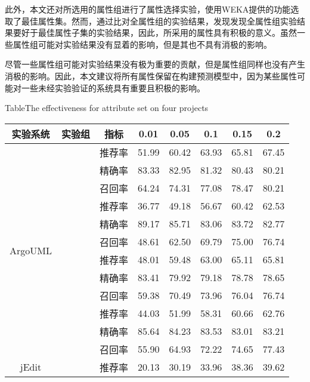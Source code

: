 此外，本文还对所选用的属性组进行了属性选择实验，使用WEKA提供的功能选取了最佳属性集。然而，通过比对全属性组的实验结果，发现发现全属性组实验结果要好于最佳属性子集的实验结果，因此，所采用的属性具有积极的意义。虽然一些属性组可能对实验结果没有显着的影响，但是其也不具有消极的影响。

尽管一些属性组可能对实验结果没有极为重要的贡献，但是属性组同样也没有产生消极的影响。因此，本文建议将所有属性保留在构建预测模型中，因为某些属性可能对一些未经实验验证的系统具有重要且积极的影响。

\begin{table} 
\renewcommand\arraystretch{0.65} 
{Table$\!$}{The effectiveness for attribute set on four projects}
\vspace{0.5em}
\centering
\wuhao
\begin{tabular}{cccccccc}
\toprule[1.5pt]
{实验系统}&{实验组}&{指标}&{0.01}&{0.05}&{0.1}&{0.15}&{0.2}\\
\midrule[1pt]
\multirow{12}{*}{ArgoUML}
&~\multirow{3}{*}{全部组(\%) }
    & 推荐率 & 51.99 & 60.42 & 63.93 & 65.81 & 67.45 \\
     && 精确率 & 83.33 & 82.95 & 81.32 & 80.43 & 80.21 \\
      & & 召回率 & 64.24 & 74.31 & 77.08 & 78.47 & 80.21 \\
\cline{2-8}
&~\multirow{3}{*}{无Code组(\%)}    
& 推荐率 & 36.77 & 49.18 & 56.67 & 60.42 & 62.53 \\
             & & 精确率 & 89.17 & 85.71 & 83.06 & 83.72 & 82.77 \\
             & &召回率 & 48.61 & 62.50 & 69.79 & 75.00 & 76.74 \\
\cline{2-8}
&~\multirow{3}{*}{无Context组   (\%)}    
 & 推荐率 & 48.01 & 59.48 & 63.00 & 65.11 & 65.81 \\
              && 精确率 & 83.41 & 79.92 & 79.18 & 78.78 & 78.65 \\
              && 召回率 & 59.38 & 70.49 & 73.96 & 76.04 & 76.74 \\
\cline{2-8}
&~\multirow{3}{*}{无Evolution组(\%)}    
 & 推荐率 & 44.03 & 51.99 & 58.31 & 60.66 & 62.76 \\
            &  & 精确率 & 85.64 & 84.23 & 83.53 & 83.01 & 83.21 \\
             & & 召回率 & 55.90 & 64.93 & 72.22 & 74.65 & 77.43 \\
\hline
\multirow{12}{*}{jEdit}
&~\multirow{3}{*}{全部组(\%) }
& 推荐率 & 20.13 & 30.19 & 33.96 & 38.36 & 39.62 \\

\end{tabular}
\end{table}
